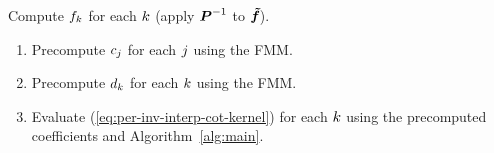 \begin{centering}
  \begin{algorithm}\label{alg:apply-P-inv}
    Compute ${f}_{k}$ for each $k$ (apply
    $\boldsymbol{P}^{-1}$ to $\boldsymbol{{\tilde{f}}_{}}$).
    \begin{enumerate}
    \item Precompute $c_{j}$ for each $j$ using the FMM.\@
    \item Precompute $d_{k}$ for each $k$ using the FMM.\@
    \item Evaluate (\ref{eq:per-inv-interp-cot-kernel}) for each
      $k$ using the precomputed coefficients and
      Algorithm~\ref{alg:main}.
    \end{enumerate}
  \end{algorithm}
\end{centering}

